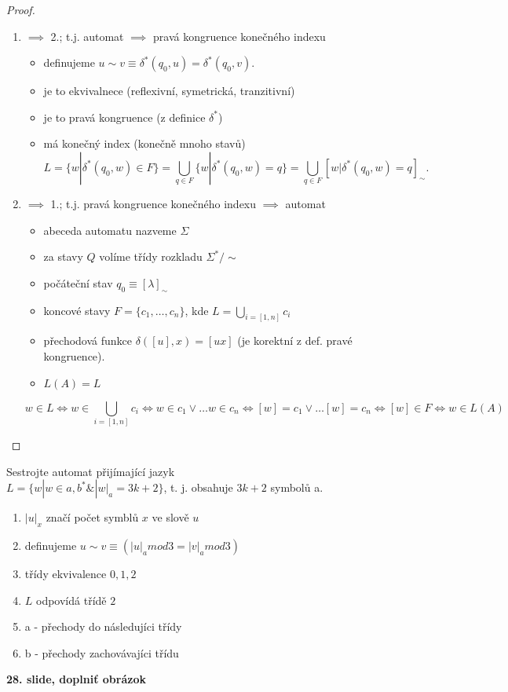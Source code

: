 \documentclass[../main.tex]{subfiles}
\begin{document}
\begin{proof}
\begin{enumerate}
    \item $\implies$ 2.; t.j. automat $\implies$ pravá kongruence konečného indexu
    \begin{itemize}
        \item definujeme $u \sim v \equiv \delta^*(q_0,u) = \delta^*(q_0,v)$.
        \item je to ekvivalnece (reflexivní, symetrická, tranzitivní)
        \item je to pravá kongruence (z definice $\delta^*$)
        \item má konečný index (konečně mnoho stavů)
        \[L = \{w|\delta^* (q_0,w)\in F\} = \bigcup_{q\in F} \{w|\delta^*(q_0,w) = q\}
         = \bigcup_{q\in F}[w|\delta^*(q_0,w) = q]_{\sim}.\]
    \end{itemize}

    \noindent
    \item $\implies$ 1.; t.j. pravá kongruence konečného indexu $\implies$ automat
    \begin{itemize}
        \item abeceda automatu nazveme $\Sigma$
        \item za stavy $Q$ volíme třídy rozkladu $\Sigma^*/\sim$
        \item počáteční stav $q_0 \equiv [\lambda]_\sim$
        \item koncové stavy $F=\{c_1,\dots,c_n\}$, kde $L=\bigcup_{i=[1,n]}c_i$
        \item přechodová funkce $\delta([u],x) = [ux]$ (je korektní z def. pravé kongruence).
        \item $L(A) = L$
    \end{itemize}
    \[w\in L \Leftrightarrow w\in \bigcup_{i=[1,n]}c_i \Leftrightarrow w\in c_1 \vee \dots w \in
    c_n \Leftrightarrow [w] = c_1 \vee \dots [w] = c_n \Leftrightarrow [w]\in F \Leftrightarrow w \in L(A)\]
\end{enumerate}
\end{proof}

\begin{example}
    Sestrojte automat přijímající jazyk \\
    $L = \{w|w \in {a,b}^* \& |w|_a = 3k + 2\}$, t. j. obsahuje $3k+2$ symbolů a.
    \begin{enumerate}
        \item $|u|_x$ značí počet symblů $x$ ve slově $u$
        \item definujeme $u \sim v \equiv (|u|_a mod 3 = |v|_a mod 3)$
        \item třídy ekvivalence $0,1,2$
        \item $L$ odpovídá třídě $2$
        \item a - přechody do následujíci třídy
        \item b - přechody zachovávajíci třídu
    \end{enumerate}
    \textbf{28. slide, doplniť obrázok}
\end{example}
\end{document}
